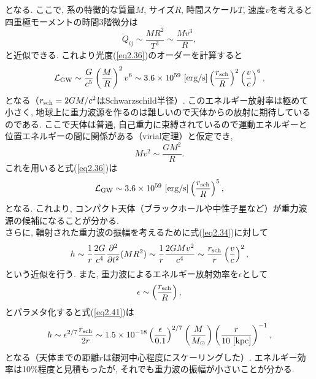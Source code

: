 となる. ここで, 系の特徴的な質量$M$, サイズ$R$, 時間スケール$T$, 速度$v$を考えると四重極モーメントの時間3階微分は
\begin{equation}
\dddot{Q}_{ij}\sim\frac{MR^2}{T^3}\sim\frac{Mv^3}{R},
\end{equation}
と近似できる. これより光度(\ref{eq2.36})のオーダーを計算すると
\begin{equation}
\mathcal{L}_{\rm GW}\sim\frac{G}{c^5}\left(\frac{M}{R}\right)^2v^6\sim3.6\times10^{59}\,\,[{\rm erg}/{\rm s}]\left(\frac{r_{\rm sch}}{R}\right)^2\left(\frac{v}{c}\right)^6,
\end{equation}
となる（$r_{\rm sch}=2GM/c^2$はSchwarzschild半径）. このエネルギー放射率は極めて小さく, 地球上に重力波源を作るのは難しいので天体からの放射に期待しているのである. ここで天体は普通, 自己重力に束縛されているので運動エネルギーと位置エネルギーの間に関係がある（virial定理）と仮定でき, 
\begin{equation}
Mv^2\sim\frac{GM^2}{R}.
\end{equation}
これを用いると式(\ref{eq2.36})は
\begin{equation}
\mathcal{L}_{\rm GW}\sim3.6\times10^{59}\,\,[{\rm erg}/{\rm s}]\left(\frac{r_{\rm sch}}{R}\right)^5,
\end{equation}
となる. これより, コンパクト天体（ブラックホールや中性子星など）が重力波源の候補になることが分かる. \\
さらに, 輻射された重力波の振幅を考えるために式(\ref{eq2.34})に対して
\begin{equation}
h\sim\frac{1}{r}\frac{2G}{c^4}\frac{\partial^2}{\partial t^2}(MR^2)\sim\frac{1}{r}\frac{2GMv^2}{c^4}\sim\frac{r_{\rm sch}}{r}\left(\frac{v}{c}\right)^2,
\label{eq2.41}
\end{equation}
という近似を行う. また, 重力波によるエネルギー放射効率を$\epsilon$として
\begin{equation}
\epsilon\sim\left(\frac{r_{\rm sch}}{R}\right),
\end{equation}
とパラメタ化すると式(\ref{eq2.41})は
\begin{equation}
h\sim\epsilon^{2/7}\frac{r_{\rm sch}}{2r}\sim1.5\times10^{-18}\left(\frac{\epsilon}{0.1}\right)^{2/7}\left(\frac{M}{M_{\odot}}\right)\left(\frac{r}{10\,\,[{\rm kpc}]}\right)^{-1},
\end{equation}
となる（天体までの距離$r$は銀河中心程度にスケーリングした）. エネルギー効率は10$\%$程度と見積もったが, それでも重力波の振幅が小さいことが分かる.  
